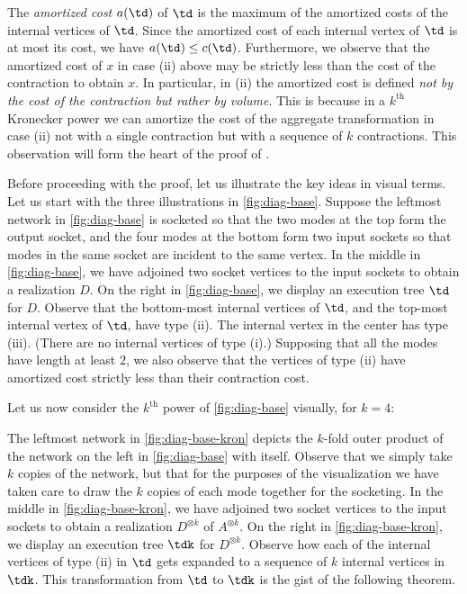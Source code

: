 The \emph{amortized cost} $a(\td)$ of $\td$ is the maximum of the amortized
costs of the internal vertices of $\td$. Since the amortized cost of each
internal vertex of $\td$ is at most its cost, we have $a(\td)\leq c(\td)$.
Furthermore, we observe that the amortized cost of $x$ in case (ii) above
may be strictly less than the cost of the contraction to obtain $x$.
In particular, in (ii) the amortized cost is defined
\emph{not by the cost of the contraction but rather by volume}.
This is because in a $k^{\text{th}}$ Kronecker power we can amortize
the cost of the aggregate transformation in case (ii) not with
a single contraction but with a sequence of $k$ contractions.
This observation will form the heart of the proof of
.

Before proceeding with the proof, let us illustrate the
key ideas in visual terms. Let us start with the three illustrations in
\eqref{fig:diag-base}.
Suppose the leftmost network in \eqref{fig:diag-base}
is socketed so that the two modes at the top form the output socket,
and the four modes at the bottom form two input sockets so that modes in the
same socket are incident to the same vertex.
In the middle in \eqref{fig:diag-base}, we have adjoined two socket
vertices to the input sockets to obtain
a realization $D$. On the right in \eqref{fig:diag-base}, we display an
execution tree $\td$ for $D$. Observe that the bottom-most internal vertices
of $\td$, and the top-most internal vertex of $\td$, have type (ii). The
internal vertex in the center has type (iii). (There are no internal vertices
of type (i).) Supposing that all the modes have length at least $2$,
we also observe that the vertices of type (ii) have
amortized cost strictly less than their contraction cost.


Let us now consider the $k^{\text{th}}$ power
of \eqref{fig:diag-base} visually, for $k=4$:


The leftmost network in \eqref{fig:diag-base-kron} depicts the
$k$-fold outer product of the network on the left
in \eqref{fig:diag-base} with itself. Observe that we simply take $k$ copies of the
network, but that for the purposes of the visualization we have taken care to draw the $k$ copies of each mode together for the socketing. In the middle in \eqref{fig:diag-base-kron},
we have adjoined two socket vertices to the input sockets to obtain
a realization $D^{\otimes k}$ of $A^{\otimes k}$. On the right in \eqref{fig:diag-base-kron},
we display an execution tree $\tdk$ for $D^{\otimes k}$. Observe how each
of the internal vertices of type (ii) in $\td$ gets expanded to a sequence
of $k$ internal vertices in $\tdk$. This transformation from $\td$ to $\tdk$
is the gist of the following theorem.


